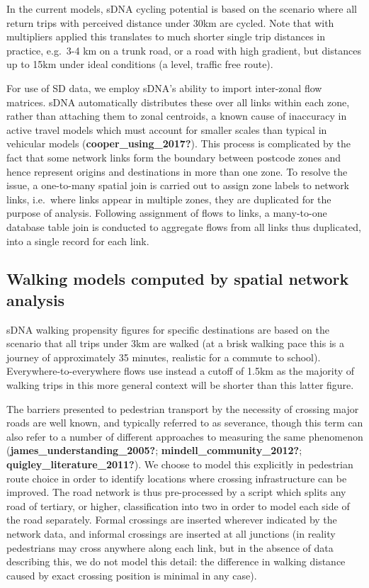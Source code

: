 \documentclass[galley]{jtlu-article-2col}
\begin{document}
In the current models, sDNA cycling potential is based on the scenario where all return trips with perceived distance under 30km are cycled.
Note that with multipliers applied this translates to much shorter single trip distances in practice, e.g.~3-4 km on a trunk road, or a road with high gradient, but distances up to 15km under ideal conditions (a level, traffic free route).

For use of SD data, we employ sDNA's ability to import inter-zonal flow matrices. sDNA automatically distributes these over all links within each zone, rather than attaching them to zonal centroids, a known cause of inaccuracy in active travel models which must account for smaller scales than typical in vehicular models (\textbf{cooper\_using\_2017?}).
This process is complicated by the fact that some network links form the boundary between postcode zones and hence represent origins and destinations in more than one zone.
To resolve the issue, a one-to-many spatial join is carried out to assign zone labels to network links, i.e.~where links appear in multiple zones, they are duplicated for the purpose of analysis.
Following assignment of flows to links, a many-to-one database table join is conducted to aggregate flows from all links thus duplicated, into a single record for each link.

\hypertarget{walking-models-computed-by-spatial-network-analysis}{%
\subsection{Walking models computed by spatial network analysis}\label{walking-models-computed-by-spatial-network-analysis}}

sDNA walking propensity figures for specific destinations are based on the scenario that all trips under 3km are walked (at a brisk walking pace this is a journey of approximately 35 minutes, realistic for a commute to school).
Everywhere-to-everywhere flows use instead a cutoff of 1.5km as the majority of walking trips in this more general context will be shorter than this latter figure.

The barriers presented to pedestrian transport by the necessity of crossing major roads are well known, and typically referred to as severance, though this term can also refer to a number of different approaches to measuring the same phenomenon (\textbf{james\_understanding\_2005?}; \textbf{mindell\_community\_2012?}; \textbf{quigley\_literature\_2011?}).
We choose to model this explicitly in pedestrian route choice in order to identify locations where crossing infrastructure can be improved.
The road network is thus pre-processed by a script which splits any road of tertiary, or higher, classification into two in order to model each side of the road separately.
Formal crossings are inserted wherever indicated by the network data, and informal crossings are inserted at all junctions (in reality pedestrians may cross anywhere along each link, but in the absence of data describing this, we do not model this detail: the difference in walking distance caused by exact crossing position is minimal in any case).
\end{document}
